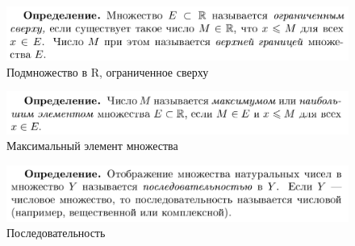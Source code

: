 \documentclass[12pt, a4paper]{article}
\begin{document}
\begin{figure}[h]
    \centering
    \caption{Подмножество в R, ограниченное сверху}
    \includegraphics[width=0.8\linewidth]{imagesMin/3.png}
\end{figure}
\begin{figure}[h]
    \centering
    \caption{Максимальный элемент множества}
    \includegraphics[width=0.8\linewidth]{imagesMin/4.png}
\end{figure}
\begin{figure}[h]
    \centering
    \caption{Последовательность}
    \includegraphics[width=0.8\linewidth]{imagesMin/5.png}
\end{figure}
\end{document}
